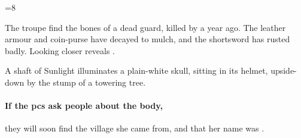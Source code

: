 \ifnum\value{r12}=8

The troupe find the bones of a dead \gls{guard}, killed by  a year ago.
The leather armour and coin-purse have decayed to mulch, and the shortsword has rusted badly.
Looking closer reveals \lootSmall.

\begin{boxtext}
  A shaft of Sunlight illuminates a plain-white skull, sitting in its helmet, upside-down by the stump of a towering tree.
\end{boxtext}

\paragraph{If the \glspl{pc} ask people about the body,}
they will soon find the \gls{village} she came from, and that her name was \composeHumanName.

\fi
